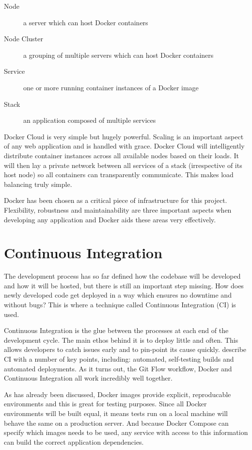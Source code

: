     \begin{description}
      \item[Node] a server which can host Docker containers
      \item[Node Cluster] a grouping of multiple servers which can host Docker containers
      \item[Service] one or more running container instances of a Docker image
      \item[Stack] an application composed of multiple services
    \end{description}

    Docker Cloud is very simple but hugely powerful. Scaling is an important aspect of any web application and is handled with grace. Docker Cloud will intelligently distribute container instances across all available nodes based on their loads. It will then lay a private network between all services of a stack (irrespective of its host node) so all containers can transparently communicate. This makes load balancing truly simple.

    Docker has been chosen as a critical piece of infrastructure for this project. Flexibility, robustness and maintainability are three important aspects when developing any application and Docker aids these areas very effectively.

  \section{Continuous Integration}
    The development process has so far defined how the codebase will be developed and how it will be hosted, but there is still an important step missing. How does newly developed code get deployed in a way which ensures no downtime and without bugs? This is where a technique called Continuous Integration (CI) is used.

    Continuous Integration is the glue between the processes at each end of the development cycle. The main ethos behind it is to deploy little and often. This allows developers to catch issues early and to pin-point its cause quickly. \citet{continuous-integration} describe CI with a number of key points, including: automated, self-testing builds and automated deployments. As it turns out, the Git Flow workflow, Docker and Continuous Integration all work incredibly well together.

    As has already been discussed, Docker images provide explicit, reproducable environments and this is great for testing purposes. Since all Docker environments will be built equal, it means tests run on a local machine will behave the same on a production server. And because Docker Compose can specify which images needs to be used, any service with access to this information can build the correct application dependencies.

